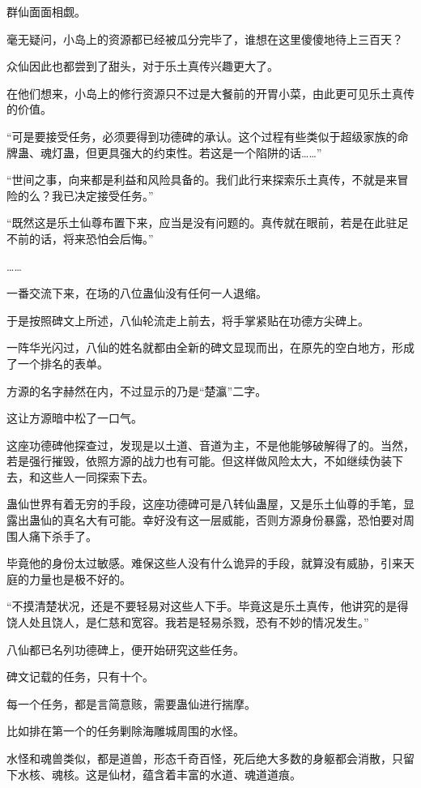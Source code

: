 \begin{this_body}
群仙面面相觑。

毫无疑问，小岛上的资源都已经被瓜分完毕了，谁想在这里傻傻地待上三百天？

众仙因此也都尝到了甜头，对于乐土真传兴趣更大了。

在他们想来，小岛上的修行资源只不过是大餐前的开胃小菜，由此更可见乐土真传的价值。

“可是要接受任务，必须要得到功德碑的承认。这个过程有些类似于超级家族的命牌蛊、魂灯蛊，但更具强大的约束性。若这是一个陷阱的话……”

“世间之事，向来都是利益和风险具备的。我们此行来探索乐土真传，不就是来冒险的么？我已决定接受任务。”

“既然这是乐土仙尊布置下来，应当是没有问题的。真传就在眼前，若是在此驻足不前的话，将来恐怕会后悔。”

……

一番交流下来，在场的八位蛊仙没有任何一人退缩。

于是按照碑文上所述，八仙轮流走上前去，将手掌紧贴在功德方尖碑上。

一阵华光闪过，八仙的姓名就都由全新的碑文显现而出，在原先的空白地方，形成了一个排名的表单。

方源的名字赫然在内，不过显示的乃是“楚瀛”二字。

这让方源暗中松了一口气。

这座功德碑他探查过，发现是以土道、音道为主，不是他能够破解得了的。当然，若是强行摧毁，依照方源的战力也有可能。但这样做风险太大，不如继续伪装下去，和这些人一同探索下去。

蛊仙世界有着无穷的手段，这座功德碑可是八转仙蛊屋，又是乐土仙尊的手笔，显露出蛊仙的真名大有可能。幸好没有这一层威能，否则方源身份暴露，恐怕要对周围人痛下杀手了。

毕竟他的身份太过敏感。难保这些人没有什么诡异的手段，就算没有威胁，引来天庭的力量也是极不好的。

“不摸清楚状况，还是不要轻易对这些人下手。毕竟这是乐土真传，他讲究的是得饶人处且饶人，是仁慈和宽容。我若是轻易杀戮，恐有不妙的情况发生。”

八仙都已名列功德碑上，便开始研究这些任务。

碑文记载的任务，只有十个。

每一个任务，都是言简意赅，需要蛊仙进行揣摩。

比如排在第一个的任务剿除海雕城周围的水怪。

水怪和魂兽类似，都是道兽，形态千奇百怪，死后绝大多数的身躯都会消散，只留下水核、魂核。这是仙材，蕴含着丰富的水道、魂道道痕。


\end{this_body}
